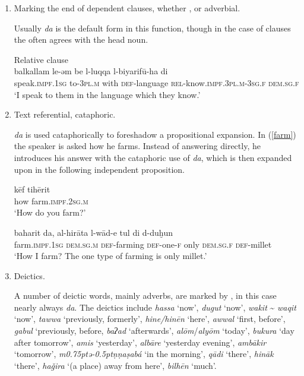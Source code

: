 \documentclass[output=paper]{langsci/langscibook}
\begin{document}
\begin{enumerate}[leftmargin=*]

\item Marking the end of dependent clauses, whether ,  or adverbial.

Usually \textit{da} is the default form in this function, though in the case of  clauses the  often agrees with the head noun.

\ea\label{luqqa}
{}{}{\label{bkm:Ref520916704}Relative clause}\\
\gll balkallam le-əm be l-luqqa l-biyarifū-ha di\\
     speak.\textsc{impf.1sg} to-\textsc{3pl.m} with \textsc{def}-language \textsc{rel-}know.\textsc{impf.3pl.m-3sg.f} \textsc{dem.sg.f}\\
\glt ‘I speak to them in the language which they know.’
\z

\item Text referential, cataphoric.

\textit{da} is used cataphorically to foreshadow a propositional expansion. In (\ref{farm}) the speaker is asked how he farms. Instead of answering directly, he introduces his answer with the cataphoric use of \textit{da}, which is then expanded upon in the following independent proposition.

\ea\label{farm}
\ea
\gll kēf tihērit\\
     how farm.\textsc{impf.2sg.m}\\
\glt ‘How do you farm?’

\ex
\gll baharit da, al-hirāta l-wād-e tul di d-duḫun\\
     farm.\textsc{impf.1sg} \textsc{dem.sg.m} \textsc{def-}farming \textsc{def-}one-\textsc{f} only \textsc{dem.sg.f} \textsc{def-}millet\\
\glt ‘How I farm? The one type of farming is only millet.’\label{tul}
\z
\z

\item Deictics.

A number of deictic words, mainly adverbs, are marked by , in this case nearly always \textit{da}. The deictics include \textit{hassa} ‘now’, \textit{dugut} ‘now’, \textit{wakit} {\textasciitilde}  \textit{waqit} ‘now’, \textit{tawwa} ‘previously, formerly’, \textit{hine/hinēn} ‘here’, \textit{awwal} ‘first, before’, \textit{gabul} ‘previously, before, \textit{baʔad} ‘afterwards’, \textit{alōm}/\textit{alyōm} ‘today’, \textit{bukura} ‘day after tomorrow’, \textit{amis} ‘yesterday’, \textit{albāre} ‘yesterday evening’, \textit{ambākir} ‘tomorrow’, \textit{m\kern 0.75ptǝ\kern -0.5ptṇṇaṣabá} ‘in the morning’, \textit{qādi} ‘there’, \textit{hināk} ‘there’, \textit{haǧira} ‘(a place) away from here’, \textit{bilhēn} ‘much’.


\end{enumerate}
\end{document}
